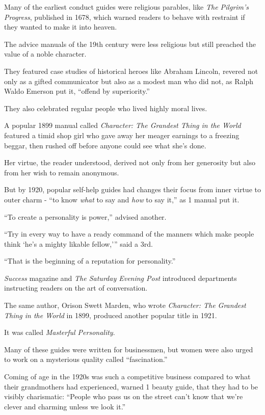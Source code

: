 \documentclass[oneside]{article}
\numberwithin{equation}{section}
\begin{document}
Many of the earliest conduct guides were religious parables, like \textit{The Pilgrim's Progress}, published in 1678, which warned readers to behave with restraint if they wanted to make it into heaven.

The advice manuals of the 19th century were less religious but still preached the value of a noble character.

They featured case studies of historical heroes like Abraham Lincoln, revered not only as a gifted communicator but also as a modest man who did not, as Ralph Waldo Emerson put it, ``offend by superiority.''

They also celebrated regular people who lived highly moral lives.

A popular 1899 manual called \textit{Character: The Grandest Thing in the World} featured a timid shop girl who gave away her meager earnings to a freezing beggar, then rushed off before anyone could see what she's done.

Her virtue, the reader understood, derived not only from her generosity but also from her wish to remain anonymous.

%
But by 1920, popular self-help guides had changes their focus from inner virtue to outer charm - ``to know \textit{what} to say and \textit{how} to say it,'' as 1 manual put it.

``To create a personality is power,'' advised another.

``Try in every way to have a ready command of the manners which make people think `he's a mighty likable fellow,''' said a 3rd.

``That is the beginning of a reputation for personality.''

\textit{Success} magazine and \textit{The Saturday Evening Post} introduced departments instructing readers on the art of conversation.

The same author, Orison Swett Marden, who wrote \textit{Character: The Grandest Thing in the World} in 1899, produced another popular title in 1921.

It was called \textit{Masterful Personality}.

%
Many of these guides were written for businessmen, but women were also urged to work on a mysterious quality called ``fascination.''

Coming of age in the 1920s was such a competitive business compared to what their grandmothers had experienced, warned 1 beauty guide, that they had to be visibly charismatic: ``People who pass us on the street can't know that we're clever and charming unless we look it.''
\end{document}
